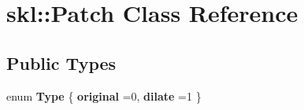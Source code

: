 \hypertarget{classskl_1_1_patch}{}\section{skl\+:\+:Patch Class Reference}
\label{classskl_1_1_patch}
\subsection*{Public Types}
\begin{DoxyCompactItemize}
\item 
\hypertarget{classskl_1_1_patch_aecc289e5d82e1ae42f2c38bfcd4d4ec7}{}\label{classskl_1_1_patch_aecc289e5d82e1ae42f2c38bfcd4d4ec7} 
enum {\bfseries Type} \{ {\bfseries original} =0, 
{\bfseries dilate} =1
 \}
\end{DoxyCompactItemize}
